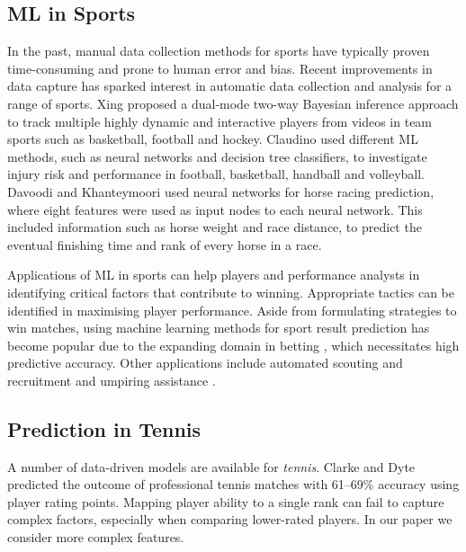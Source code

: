\subsection{ML in Sports}

In the past, manual data collection methods for sports have typically proven time-consuming and prone to human error and bias. Recent improvements in data capture has sparked interest in automatic data collection and analysis for a range of sports. Xing \etal \cite{xing2010multiple} proposed a dual-mode two-way Bayesian inference approach to track multiple highly dynamic and interactive players from videos in team sports such as basketball, football and hockey. Claudino \etal \cite{claudino2019current} used different ML methods, such as neural networks and decision tree classifiers, to investigate injury risk and performance in football, basketball, handball and volleyball. Davoodi and Khanteymoori \cite{davoodi2010horse} used neural networks for horse racing prediction, where eight features were used as input nodes to each neural network. This included information such as horse weight and race distance, to predict the eventual finishing time and rank of every horse in a race. 




Applications of ML in sports can help players and performance analysts in identifying critical factors that contribute to winning. Appropriate tactics can be identified in maximising player performance.
Aside from formulating strategies to win matches, using machine learning methods for sport result prediction has become popular due to the expanding domain in betting \cite{bunker2019machine}, which necessitates high predictive accuracy. Other applications include automated scouting and recruitment \cite{bunker2019machine} and umpiring assistance \cite{vzemgulys2018recognition}.


\subsection{Prediction in Tennis}
A number of data-driven models are available for \textit{tennis}. 
Clarke and Dyte \cite{clarke2000using} predicted the outcome of professional tennis matches with 61--69\% accuracy using player rating points. Mapping player ability to a single rank can fail to capture complex factors, especially when comparing lower-rated players. In our paper we consider more complex features.

